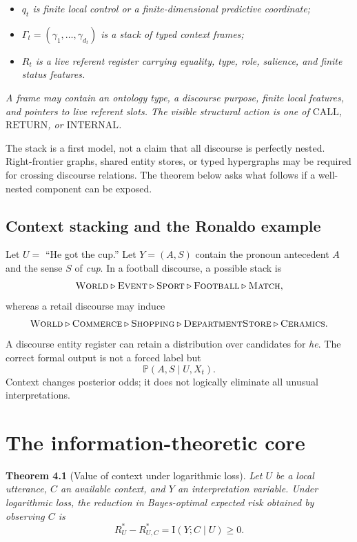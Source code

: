 \documentclass[11pt]{article}
\begin{document}
\begin{itemize}
\item
  \emph{\(q_t\) is finite local control or a finite-dimensional predictive coordinate;}
\item
  \emph{\(\Gamma_t=(\gamma_1,\ldots,\gamma_{d_t})\) is a stack of typed context frames;}
\item
  \emph{\(R_t\) is a live referent register carrying equality, type, role, salience, and finite status features.}
\end{itemize}

\emph{A frame may contain an ontology type, a discourse purpose, finite local features, and pointers to live referent slots. The visible structural action is one of \(\mathrm{CALL}\), \(\mathrm{RETURN}\), or \(\mathrm{INTERNAL}\).}

The stack is a first model, not a claim that all discourse is perfectly nested. Right-frontier graphs, shared entity stores, or typed hypergraphs may be required for crossing discourse relations. The theorem below asks what follows if a well-nested component can be exposed.

\subsection{Context stacking and the Ronaldo example}\label{context-stacking-and-the-ronaldo-example}

Let \(U=\) ``He got the cup.'' Let \(Y=(A,S)\) contain the pronoun antecedent \(A\) and the sense \(S\) of \emph{cup}. In a football discourse, a possible stack is \[\textsc{World}\triangleright\textsc{Event}\triangleright\textsc{Sport}
\triangleright\textsc{Football}\triangleright\textsc{Match},\] whereas a retail discourse may induce \[\textsc{World}\triangleright\textsc{Commerce}\triangleright\textsc{Shopping}
\triangleright\textsc{DepartmentStore}\triangleright\textsc{Ceramics}.\] A discourse entity register can retain a distribution over candidates for \emph{he}. The correct formal output is not a forced label but \[\mathbb{P}(A,S\mid U,X_t).\] Context changes posterior odds; it does not logically eliminate all unusual interpretations.

\section{The information-theoretic core}\label{the-information-theoretic-core}

\label{thm:context-value}
\textbf{Theorem 4.1} (Value of context under logarithmic loss). \emph{Let \(U\) be a local utterance, \(C\) an available context, and \(Y\) an interpretation variable. Under logarithmic loss, the reduction in Bayes-optimal expected risk obtained by observing \(C\) is \[R_U^*-R_{U,C}^*=\mathrm{I}(Y;C\mid U)\geq0.\]}
\end{document}
